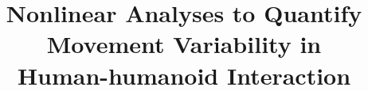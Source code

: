 













\title{	Nonlinear Analyses to Quantify  \\ 
	Movement Variability in \\ 
	Human-humanoid Interaction
	} 




